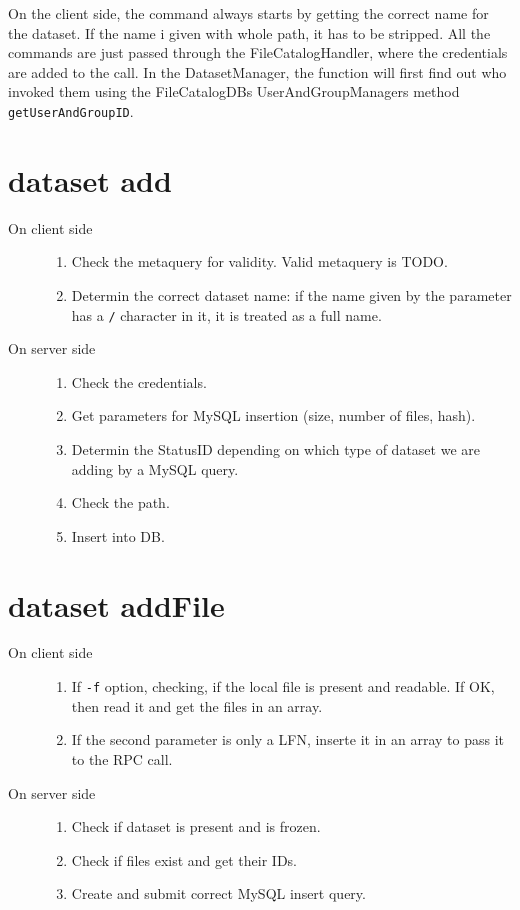 \documentclass{scrreprt}
\begin{document}
On the client side, the command always starts by getting the correct name for the dataset. If the name i given with whole path, it has to be stripped.
All the commands are just passed through the FileCatalogHandler, where the credentials are added to the call. In the DatasetManager, the function will first find out who invoked them using the FileCatalogDBs UserAndGroupManagers method \texttt{getUserAndGroupID}.


\section{dataset add}
\begin{description}
%
\item[On client side] \hfill 
\begin{enumerate}
\item Check the metaquery for validity. Valid metaquery is TODO. 
\item Determin the correct dataset name: if the name given by the parameter has a \texttt{/} character in it, it is treated as a full name.
\end{enumerate}
%
\item[On server side] \hfill 
\begin{enumerate}
\item Check the credentials.
\item Get parameters for MySQL insertion (size, number of files, hash).
\item Determin the StatusID depending on which type of dataset we are adding by a MySQL query. 
\item Check the path.
\item Insert into DB.
\end{enumerate}

\end{description}


\section{dataset addFile}
\begin{description}
%
\item[On client side] \hfill 
\begin{enumerate}
\item If \texttt{-f} option, checking, if the local file is present and readable. If OK, then read it and get the files in an array.
\item If the second parameter is only a LFN, inserte it in an array to pass it to the RPC call.
\end{enumerate}
%
\item[On server side] \hfill
\begin{enumerate}
\item Check if dataset is present and is frozen.
\item Check if files exist and get their IDs.
\item Create and submit correct MySQL insert query.
\end{enumerate}

\end{description}
\end{document}
